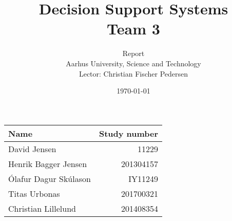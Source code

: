 \documentclass[a4paper,11pt,oneside]{memoir}
\title{Decision Support Systems \\ Team 3}
\author{Report \\ Aarhus University, Science and Technology \\ Lector: Christian Fischer Pedersen}
\date{\today}
\begin{document}
\fancyhf{} %
\frontmatter
\maketitle
\vfill


\begin{table} [h]
	\centering
	\begin{tabular}{|l|r|}
	\hline 
	\textbf{Name} 				& \textbf{Study number}  	\\ \hline
	David Jensen 				& 11229 	 				\\ \hline
	Henrik Bagger Jensen 		& 201304157  				\\ \hline
	Ólafur Dagur Skúlason 		& IY11249	 				\\ \hline
	Titas Urbonas 				& 201700321 				\\ \hline
	Christian Lillelund 		& 201408354  				\\ \hline
	\end{tabular}
\end{table}

\vfill

\clearpage
\pagestyle{plain}

\tableofcontents

\vfill

\mainmatter
\pagestyle{fancy}
\fancyhf{} %
\fancyhead[C]{\nouppercase{\leftmark}}
\fancyfoot[C]{\nouppercase{\rightmark}}
\fancyfoot[R]{\thepage}

										    \clearpage
								    \clearpage
										\clearpage
					\clearpage
						\clearpage
							\clearpage
							\clearpage
						\clearpage
								        \clearpage
										\clearpage
									\clearpage

\end{document}
